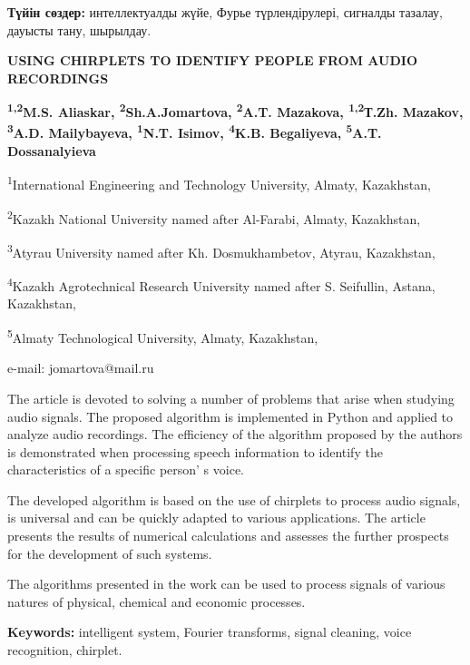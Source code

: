 {\bfseries Түйін сөздер:} интеллектуалды жүйе, Фурье түрлендірулері,
сигналды тазалау, дауысты тану, шырылдау.

\begin{articleheader}
{\bfseries USING CHIRPLETS TO IDENTIFY PEOPLE FROM AUDIO RECORDINGS}

{\bfseries
\textsuperscript{1,2}M.S. Aliaskar,
\textsuperscript{2}Sh.A.Jomartova\textsuperscript{\envelope },
\textsuperscript{2}A.T. Mazakova,
\textsuperscript{1,2}Т.Zh. Mazakov,
\textsuperscript{3}A.D. Mailybayeva,
\textsuperscript{1}N.T. Isimov,
\textsuperscript{4}K.B. Begaliyeva,
\textsuperscript{5}A.T. Dossanalyieva
}
\end{articleheader}

\begin{affiliation}
\textsuperscript{1}International Engineering and Technology University, Almaty, Kazakhstan,

\textsuperscript{2}Kazakh National University named after Al-Farabi, Almaty, Kazakhstan,

\textsuperscript{3}Atyrau University named after Kh. Dosmukhambetov, Atyrau, Kazakhstan,

\textsuperscript{4}Kazakh Agrotechnical Research University named after S. Seifullin, Astana, Kazakhstan,

\textsuperscript{5}Almaty Technological University, Almaty, Kazakhstan,

e-mail: jomartova@mail.ru
\end{affiliation}

The article is devoted to solving a number of problems that arise when
studying audio signals. The proposed algorithm is implemented in Python
and applied to analyze audio recordings. The efficiency of the algorithm
proposed by the authors is demonstrated when processing speech
information to identify the characteristics of a specific
person' s voice.

The developed algorithm is based on the use of chirplets to process
audio signals, is universal and can be quickly adapted to various
applications. The article presents the results of numerical calculations
and assesses the further prospects for the development of such systems.

The algorithms presented in the work can be used to process signals of
various natures of physical, chemical and economic processes.

{\bfseries Keywords:} intelligent system, Fourier transforms, signal
cleaning, voice recognition, chirplet.

